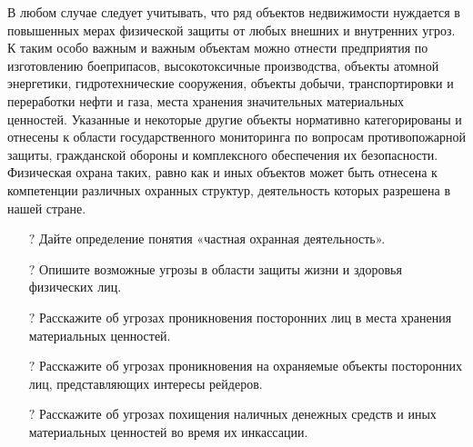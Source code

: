 \documentclass[a4paper,12pt,fleqn]{article} %
\begin{document}
В любом случае следует учитывать, что ряд объектов недвижимости нуждается в повышенных мерах физической защиты от любых внешних и внутренних угроз. К таким особо важным и важным объектам можно отнести предприятия по изготовлению боеприпасов, высокотоксичные производства, объекты атомной энергетики, гидротехнические сооружения, объекты добычи, транспортировки и переработки нефти и газа, места хранения значительных материальных ценностей. Указанные и некоторые другие объекты нормативно категорированы и отнесены к области государственного мониторинга по вопросам противопожарной защиты, гражданской обороны и комплексного обеспечения их безопасности. Физическая охрана таких, равно как и иных объектов может быть отнесена к компетенции различных охранных структур, деятельность которых разрешена в нашей стране.\\	

\begin{tcolorbox}[colback=blue!40!red!1!,colframe=blue!40!red,enforce breakable,%
	pad at break=1mm, title=Вопросы и задания для самоконтроля]
	\begin{itemize}
		\item[{\color{blue!55!red}\Huge { $ ? $}} ]  Дайте определение понятия «частная охранная деятельность».
		\item[{\color{blue!55!red}\Huge {  $ ? $}} ] Опишите возможные угрозы в области защиты жизни и здоровья физических лиц.
		\item[{\color{blue!55!red}\Huge {  $ ? $}} ] Расскажите об угрозах проникновения посторонних лиц в места хранения материальных ценностей.
		\item[{\color{blue!55!red}\Huge {  $ ? $}} ] Расскажите об угрозах проникновения на охраняемые объекты посторонних лиц, представляющих интересы рейдеров.
		\item[{\color{blue!55!red}\Huge {  $ ? $}} ] Расскажите об угрозах похищения наличных денежных средств и иных материальных ценностей во время их инкассации.		
	\end{itemize}		
\end{tcolorbox}
\end{document}
